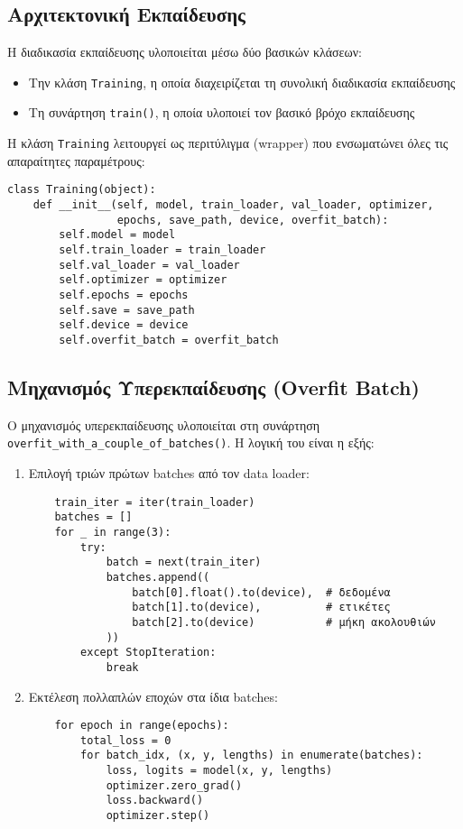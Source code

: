 \documentclass[a4paper,12pt]{article}
\begin{document}
\subsection*{Αρχιτεκτονική Εκπαίδευσης}

Η διαδικασία εκπαίδευσης υλοποιείται μέσω δύο βασικών κλάσεων:

\begin{itemize}
    \item Την κλάση \texttt{Training}, η οποία διαχειρίζεται τη συνολική διαδικασία εκπαίδευσης
    \item Τη συνάρτηση \texttt{train()}, η οποία υλοποιεί τον βασικό βρόχο εκπαίδευσης
\end{itemize}

Η κλάση \texttt{Training} λειτουργεί ως περιτύλιγμα (wrapper) που ενσωματώνει όλες τις απαραίτητες παραμέτρους:

\begin{verbatim}
class Training(object):
    def __init__(self, model, train_loader, val_loader, optimizer, 
                 epochs, save_path, device, overfit_batch):
        self.model = model
        self.train_loader = train_loader
        self.val_loader = val_loader
        self.optimizer = optimizer
        self.epochs = epochs
        self.save = save_path
        self.device = device
        self.overfit_batch = overfit_batch
\end{verbatim}

\subsection*{Μηχανισμός Υπερεκπαίδευσης (Overfit Batch)}

Ο μηχανισμός υπερεκπαίδευσης υλοποιείται στη συνάρτηση \texttt{overfit\_with\_a\_couple\_of\_batches()}. Η λογική του είναι η εξής:

\begin{enumerate}
    \item Επιλογή τριών πρώτων batches από τον data loader:
    \begin{verbatim}
    train_iter = iter(train_loader)
    batches = []
    for _ in range(3):
        try:
            batch = next(train_iter)
            batches.append((
                batch[0].float().to(device),  # δεδομένα
                batch[1].to(device),          # ετικέτες
                batch[2].to(device)           # μήκη ακολουθιών
            ))
        except StopIteration:
            break
    \end{verbatim}

    \item Εκτέλεση πολλαπλών εποχών στα ίδια batches:
    \begin{verbatim}
    for epoch in range(epochs):
        total_loss = 0
        for batch_idx, (x, y, lengths) in enumerate(batches):
            loss, logits = model(x, y, lengths) 
            optimizer.zero_grad()
            loss.backward()
            optimizer.step()
    \end{verbatim}
\end{enumerate}
\end{document}
